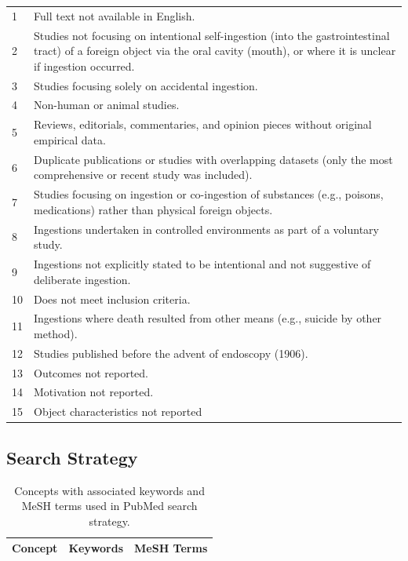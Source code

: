 \begin{appendices}
\begin{table}[h]
\begin{tabular}{p{1cm} p{11cm}}
1 & Full text not available in English. \\
2 & Studies not focusing on intentional self-ingestion (into the gastrointestinal tract) of a foreign object via the oral cavity (mouth), or where it is unclear if ingestion occurred. \\
3 & Studies focusing solely on accidental ingestion. \\
4 & Non-human or animal studies. \\
5 & Reviews, editorials, commentaries, and opinion pieces without original empirical data. \\
6 & Duplicate publications or studies with overlapping datasets (only the most comprehensive or recent study was included). \\
7 & Studies focusing on ingestion or co-ingestion of substances (e.g., poisons, medications) rather than physical foreign objects. \\
8 & Ingestions undertaken in controlled environments as part of a voluntary study. \\
9 & Ingestions not explicitly stated to be intentional and not suggestive of deliberate ingestion. \\
10 & Does not meet inclusion criteria. \\
11 & Ingestions where death resulted from other means (e.g., suicide by other method). \\
12 & Studies published before the advent of endoscopy (1906). \\
13 & Outcomes not reported. \\
14 & Motivation not reported. \\
15 & Object characteristics not reported\\
\bottomrule
\end{tabular}
\end{table}

\clearpage

\subsection{Search Strategy}
\label{appendix:search-strategy}

\begin{table}[h]
\caption{Concepts with associated keywords and MeSH terms used in PubMed search strategy.}
\label{tab:pubmed_search_terms}
\centering
\begin{tabular}{p{3cm} p{6cm} p{6cm}}
\toprule
\textbf{Concept} & \textbf{Keywords} & \textbf{MeSH Terms} \\
\midrule


\end{tabular}
\end{table}
\end{appendices}
